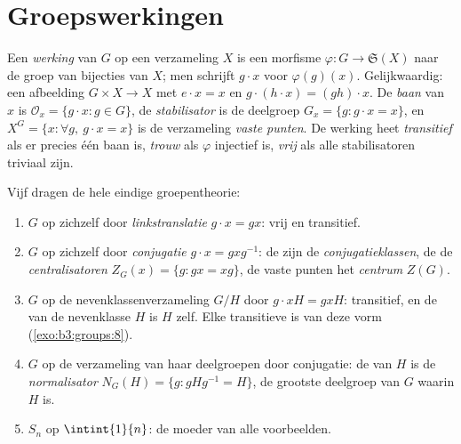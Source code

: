 \section{Groepswerkingen}

\begin{definition}\label{def:b3:groups:action}
Een \emph{werking} van $G$ op een verzameling
$X$ is een morfisme $\varphi \colon G \to \mathfrak{S}(X)$ naar de
groep van bijecties van $X$; men schrijft $g \cdot x$ voor
$\varphi(g)(x)$. Gelijkwaardig: een afbeelding $G \times X \to X$
met $e \cdot x = x$ en $g \cdot (h \cdot x) = (gh) \cdot x$. De
\emph{baan} van $x$ is $\mathcal O_x = \{g \cdot x : g
\in G\}$, de \emph{stabilisator} is de
deelgroep $G_x = \{g : g\cdot x = x\}$, en $X^G = \{x : \forall
g,\ g \cdot x = x\}$ is de verzameling \emph{vaste punten}. De
werking heet \emph{transitief} als er precies één baan is,
\emph{trouw} als $\varphi$ injectief is, \emph{vrij} als alle
stabilisatoren triviaal zijn.
\end{definition}

\begin{example}\label{ex:b3:groups:actions}
Vijf  dragen de hele eindige groepentheorie:
\begin{enumerate}
  \item $G$ op zichzelf door \emph{linkstranslatie} $g \cdot x =
        gx$: vrij en transitief.
  \item $G$ op zichzelf door \emph{conjugatie} $g \cdot x =
        gxg^{-1}$: de  zijn de
        \emph{conjugatieklassen}, de
         de \emph{centralisatoren}
         $Z_G(x) = \{g : gx = xg\}$, de vaste
        punten het \emph{centrum} $Z(G)$.
  \item $G$ op de nevenklassenverzameling $G/H$ door $g \cdot xH =
        gxH$: transitief, en de  van de nevenklasse $H$
        is $H$ zelf. Elke transitieve  is van deze vorm
        (\cref{exo:b3:groups:8}).
  \item $G$ op de verzameling van haar deelgroepen door conjugatie:
        de  van $H$ is de
        \emph{normalisator} $N_G(H) = \{g :
        gHg^{-1} = H\}$, de grootste deelgroep van $G$ waarin $H$
         is.
  \item $S_n$ op $\intint{1}{n}$: de moeder van alle voorbeelden.
\end{enumerate}
\end{example}

